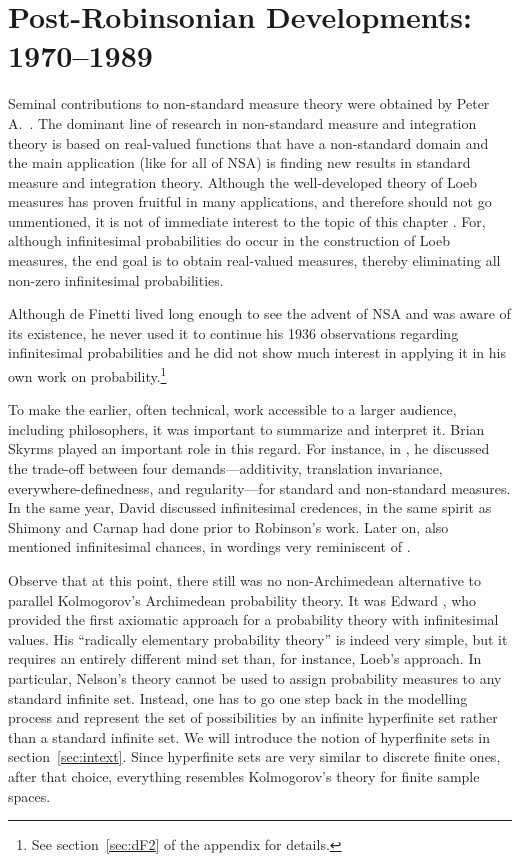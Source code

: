 \section{Post-Robinsonian Developments: 1970--1989}\label{sec:postR}
Seminal contributions to non-standard measure theory were obtained by Peter A.~\citet{Loeb:1975}. The dominant line of research in non-standard measure and integration theory is based on real-valued functions that have a non-standard domain and the main application (like for all of NSA) is finding new results in standard measure and integration theory.
Although the well-developed theory of Loeb measures has proven fruitful in many applications, and therefore should not go unmentioned, it is not of immediate interest to the topic of this chapter \citep[but see][]{Herzberg:2007a,Herzberg:2010}. For, although infinitesimal probabilities do occur in the construction of Loeb measures, the end goal is to obtain real-valued measures, thereby eliminating all non-zero infinitesimal probabilities.

Although de Finetti lived long enough to see the advent of NSA and was aware of its existence, he never used it to continue his 1936 observations regarding infinitesimal probabilities and he did not show much interest in applying it in his own work on probability.\footnote{See section~\ref{sec:dF2} of the appendix for details.}

To make the earlier, often technical, work accessible to a larger audience, including philosophers, it was important to summarize and interpret it. Brian Skyrms played an important role in this regard. For instance, in \citet[appendix~4]{Skyrms:1980}, he discussed the trade-off between four demands---additivity, translation invariance, everywhere-definedness, and regularity---for standard and non-standard measures. In the same year, David \citet{Lewis:1980} discussed infinitesimal credences, in the same spirit as Shimony and Carnap had done prior to Robinson's work. Later on, \citet{Lewis:1986specific} also mentioned infinitesimal chances, in wordings very reminiscent of \citet{BernsteinWattenberg:1969}.

Observe that at this point, there still was no non-Archimedean alternative to parallel Kolmogorov's Archimedean probability theory. It was Edward \citet{Nelson:1987}, who provided the first axiomatic approach for a probability theory with infinitesimal values. His ``radically elementary probability theory'' is indeed very simple, but it requires an entirely different mind set than, for instance, Loeb's approach. In particular, Nelson's theory cannot be used to assign probability measures to any standard infinite set. Instead, one has to go one step back in the modelling process and represent the set of possibilities by an infinite hyperfinite set rather than a standard infinite set. We will introduce the notion of hyperfinite sets in section~\ref{sec:intext}. Since hyperfinite sets are very similar to discrete finite ones, after that choice, everything resembles Kolmogorov's theory for finite sample spaces.

